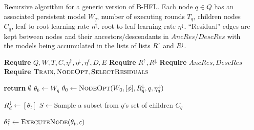 \begin{algorithm}[H]
    \caption[Bidirectional Hierarchical FL]{Recursive algorithm for a generic version of B-HFL. Each node $q \in Q$ has an associated persistent model $W_q$, number of executing rounds $T_q$, children nodes $C_q$, leaf-to-root learning rate $\eta^\uparrow$, root-to-leaf learning rate $\eta^\downarrow$. ``Residual'' edges are kept between nodes and their ancestors/descendants in $AncRes/DescRes$
        with the models being accumulated in the lists of lists $R^\uparrow$ and $R^\downarrow$. }\label{alg:B-HFL}
    \begin{onehalfspace}

        \begin{algorithmic}[1]
            \State \textbf{Require} \(Q, W, T, C, \eta^\uparrow, \eta^\downarrow, \eta^l,D,E\) \label{alg:B-HFL:line:r0}
            \State \textbf{Require}  $R^{\uparrow},R^{\downarrow}$  \label{alg:B-HFL:line:r1}
            \State \textbf{Require}  $AncRes,DescRes $  \label{alg:B-HFL:line:r2}
            \State \textbf{Require}  \(\textsc{Train} ,\textsc{NodeOpt}, \textsc{SelectResiduals}  \) \label{alg:B-HFL:line:r3}

              \label{alg:B-HFL:line:1}
            \textbf{return} $\emptyset$  \label{alg:B-HFL:line:2}
            \EndIf
            \State $\theta_0 \gets W_q$   \label{alg:B-HFL:line:3}
            \If{$\phi \neq \emptyset$} \label{alg:B-HFL:line:4}
            \State $\theta_0 \gets \Call{NodeOpt}{W_0,[\phi], R^\downarrow_q, q, \eta^\downarrow_q} $  \label{alg:B-HFL:line:5}
            \EndIf



             \label{alg:B-HFL:line:6}
              \label{alg:B-HFL:line:8}
            \State $ R^\downarrow_d \gets [\theta_t]$ \label{alg:B-HFL:line:9}
            \EndFor
            \State $S \gets $Sample a subset from $q$'s set of children $C_q$ \label{alg:B-HFL:line:10}


             \label{alg:B-HFL:line:11}
            \State $\theta_t^c \gets \Call{ExecuteNode}{\theta_t, c} $  \label{alg:B-HFL:line:12}


\end{algorithmic}
\end{onehalfspace}
\end{algorithm}
